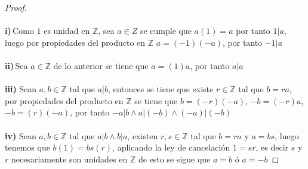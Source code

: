 \documentclass[11pt,letterpaper]{article}
\newcommand{\Z}{\mathbb{Z}}
\begin{document}
\begin{proof}\,\\
    \,\\
    \textbf{i)}\,Como $1$  es unidad en $\Z$, sea $a\in Z$ se cumple que $a(1)=a$ por tanto $1|a$, luego por propiedades
    del producto en $\Z$ $a=(-1)(-a)$, por tanto $-1|a$\,\\
    \,\\
    \textbf{ii)}\,Sea $a\in \Z$ de lo anterior se tiene que $a=(1)a$, por tanto $a|a$\,\\
    \,\\
    \textbf{iii)} Sean $a,b\in \Z$ tal que $a|b$, entonces se tiene que existe $r\in \Z$ tal que
    $b=ra$, por propiedades del producto en $\Z$ se tiene que $b=(-r)(-a)$, $-b=(-r)a$, $-b=(r)(-a)$, por tanto
    $-a|b \land a|(-b) \land (-a)|(-b)$\,\\
    \,\\
    \textbf{iv)} Sean $a,b\in \Z$ tal que $a|b \land b|a$, existen $r,s \in \Z$ tal que
    $b=ra$ y $a=bs$, luego tenemos que $b(1)=bs(r)$, aplicando la ley de cancelaci\'on $1=sr$, es decir $s$ y $r$ necesariamente
    son unidades en $\Z$ de esto se sigue que $a=b$ ó $a=-b$
\end{proof}\,\\
\end{document}
